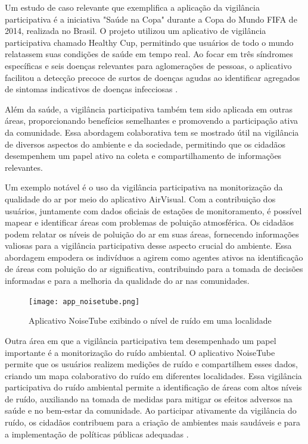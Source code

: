 Um estudo de caso relevante que exemplifica a aplicação da vigilância participativa é a iniciativa "Saúde na Copa" durante a Copa do Mundo FIFA de 2014, realizada no Brasil. O projeto utilizou um aplicativo de vigilância participativa chamado Healthy Cup, permitindo que usuários de todo o mundo relatassem suas condições de saúde em tempo real. Ao focar em três síndromes específicas e seis doenças relevantes para aglomerações de pessoas, o aplicativo facilitou a detecção precoce de surtos de doenças agudas ao identificar agregados de sintomas indicativos de doenças infecciosas \cite{2017_LealNeto}.

Além da saúde, a vigilância participativa também tem sido aplicada em outras áreas, proporcionando benefícios semelhantes e promovendo a participação ativa da comunidade. Essa abordagem colaborativa tem se mostrado útil na vigilância de diversos aspectos do ambiente e da sociedade, permitindo que os cidadãos desempenhem um papel ativo na coleta e compartilhamento de informações relevantes.

Um exemplo notável é o uso da vigilância participativa na monitorização da qualidade do ar por meio do aplicativo AirVisual. Com a contribuição dos usuários, juntamente com dados oficiais de estações de monitoramento, é possível mapear e identificar áreas com problemas de poluição atmosférica. Os cidadãos podem relatar os níveis de poluição do ar em suas áreas, fornecendo informações valiosas para a vigilância participativa desse aspecto crucial do ambiente. Essa abordagem empodera os indivíduos a agirem como agentes ativos na identificação de áreas com poluição do ar significativa, contribuindo para a tomada de decisões informadas e para a melhoria da qualidade do ar nas comunidades.

\begin{figure}[!htb]
    \caption{Aplicativo NoiseTube exibindo o nível de ruído em uma localidade}
    \label{fig:app_noisetube}
    \centering
    \texttt{[image: app\_noisetube.png]}
\end{figure}

Outra área em que a vigilância participativa tem desempenhado um papel importante é a monitorização do ruído ambiental. O aplicativo NoiseTube permite que os usuários realizem medições de ruído e compartilhem esses dados, criando um mapa colaborativo do ruído em diferentes localidades. Essa vigilância participativa do ruído ambiental permite a identificação de áreas com altos níveis de ruído, auxiliando na tomada de medidas para mitigar os efeitos adversos na saúde e no bem-estar da comunidade. Ao participar ativamente da vigilância do ruído, os cidadãos contribuem para a criação de ambientes mais saudáveis e para a implementação de políticas públicas adequadas \cite{2010_Arnand}.

